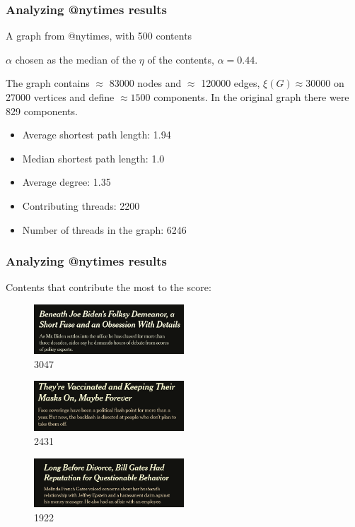 \documentclass{beamer}
\begin{document}
\begin{frame}[c]
	\frametitle{Analyzing @nytimes results}
	A graph from @nytimes, with 500 contents

	$\alpha $ chosen as the median of the $\eta$ of the contents, $\alpha =
		0.44$.

	The graph contains $\approx$ 83000 nodes and $\approx$ 120000 edges,
	$\xi(G) \approx 30000 $ on 27000
	vertices and define $\approx 1500$ components. In the original graph there
	were 829 components.

	\begin{itemize}
		\item Average shortest path length: 1.94
		\item Median shortest path length: 1.0
		\item Average degree: 1.35
		\item Contributing threads: 2200
		\item Number of threads in the graph: 6246
	\end{itemize}

\end{frame}

\begin{frame}[c]
	\frametitle{Analyzing @nytimes results}

	Contents that contribute the most to the score:
	\begin{figure}[htpb]
		\centering
		\includegraphics[width=0.5\textwidth]{out/nytimes700/results/content1.png}
		\caption{3047}
		\label{fig:name}
	\end{figure}
	\begin{figure}[htpb]
		\centering
		\includegraphics[width=0.5\textwidth]{out/nytimes700/results/content2.png}
		\caption{2431}
		\label{fig:name}
	\end{figure}
	\begin{figure}[htpb]
		\centering
		\includegraphics[width=0.5\textwidth]{out/nytimes700/results/content3.png}
		\caption{1922}
		\label{fig:name}
	\end{figure}


\end{frame}
\end{document}
